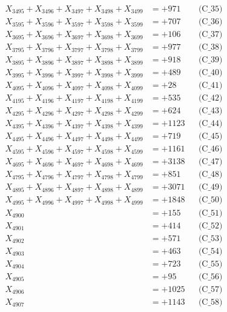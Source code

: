 \documentclass[a4paper,10pt]{article}
\begin{document}
{\begin{align}
X_{3495} + X_{3496} + X_{3497} + X_{3498} + X_{3499} &= +971 && \text{(C\_35)} \\
\allowbreak
X_{3595} + X_{3596} + X_{3597} + X_{3598} + X_{3599} &= +707 && \text{(C\_36)} \\
X_{3695} + X_{3696} + X_{3697} + X_{3698} + X_{3699} &= +106 && \text{(C\_37)} \\
X_{3795} + X_{3796} + X_{3797} + X_{3798} + X_{3799} &= +977 && \text{(C\_38)} \\
X_{3895} + X_{3896} + X_{3897} + X_{3898} + X_{3899} &= +918 && \text{(C\_39)} \\
X_{3995} + X_{3996} + X_{3997} + X_{3998} + X_{3999} &= +489 && \text{(C\_40)} \\
\allowbreak
X_{4095} + X_{4096} + X_{4097} + X_{4098} + X_{4099} &= +28 && \text{(C\_41)} \\
X_{4195} + X_{4196} + X_{4197} + X_{4198} + X_{4199} &= +535 && \text{(C\_42)} \\
X_{4295} + X_{4296} + X_{4297} + X_{4298} + X_{4299} &= +624 && \text{(C\_43)} \\
X_{4395} + X_{4396} + X_{4397} + X_{4398} + X_{4399} &= +1123 && \text{(C\_44)} \\
X_{4495} + X_{4496} + X_{4497} + X_{4498} + X_{4499} &= +719 && \text{(C\_45)} \\
\allowbreak
X_{4595} + X_{4596} + X_{4597} + X_{4598} + X_{4599} &= +1161 && \text{(C\_46)} \\
X_{4695} + X_{4696} + X_{4697} + X_{4698} + X_{4699} &= +3138 && \text{(C\_47)} \\
X_{4795} + X_{4796} + X_{4797} + X_{4798} + X_{4799} &= +851 && \text{(C\_48)} \\
X_{4895} + X_{4896} + X_{4897} + X_{4898} + X_{4899} &= +3071 && \text{(C\_49)} \\
X_{4995} + X_{4996} + X_{4997} + X_{4998} + X_{4999} &= +1848 && \text{(C\_50)} \\
\allowbreak
X_{4900} &= +155 && \text{(C\_51)} \\
X_{4901} &= +414 && \text{(C\_52)} \\
X_{4902} &= +571 && \text{(C\_53)} \\
X_{4903} &= +463 && \text{(C\_54)} \\
X_{4904} &= +723 && \text{(C\_55)} \\
\allowbreak
X_{4905} &= +95 && \text{(C\_56)} \\
X_{4906} &= +1025 && \text{(C\_57)} \\
X_{4907} &= +1143 && \text{(C\_58)} \\

\end{align}}
\end{document}
